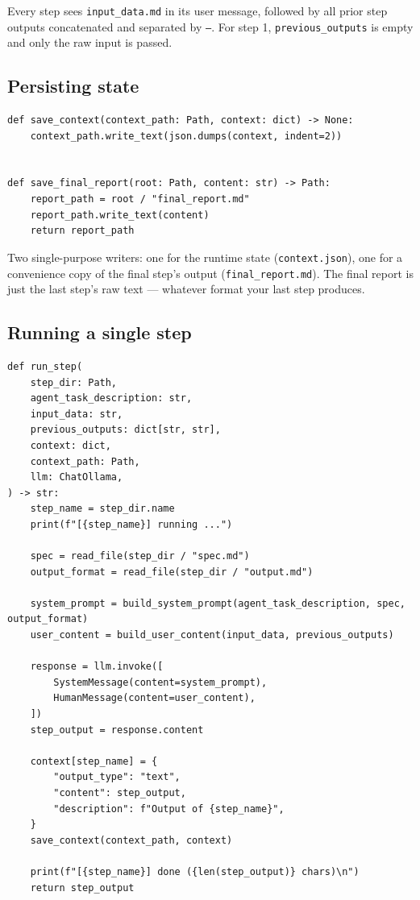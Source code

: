 \documentclass[12pt, a4paper]{article}
\begin{document}
Every step sees \texttt{input\_data.md} in its user message, followed by all prior step outputs concatenated and separated by \texttt{---}. For step 1, \texttt{previous\_outputs} is empty and only the raw input is passed.

\subsection{Persisting state}

\begin{lstlisting}[style=pythonstyle]
def save_context(context_path: Path, context: dict) -> None:
    context_path.write_text(json.dumps(context, indent=2))


def save_final_report(root: Path, content: str) -> Path:
    report_path = root / "final_report.md"
    report_path.write_text(content)
    return report_path
\end{lstlisting}

Two single-purpose writers: one for the runtime state (\texttt{context.json}), one for a convenience copy of the final step's output (\texttt{final\_report.md}). The final report is just the last step's raw text --- whatever format your last step produces.

\subsection{Running a single step}

\begin{lstlisting}[style=pythonstyle]
def run_step(
    step_dir: Path,
    agent_task_description: str,
    input_data: str,
    previous_outputs: dict[str, str],
    context: dict,
    context_path: Path,
    llm: ChatOllama,
) -> str:
    step_name = step_dir.name
    print(f"[{step_name}] running ...")

    spec = read_file(step_dir / "spec.md")
    output_format = read_file(step_dir / "output.md")

    system_prompt = build_system_prompt(agent_task_description, spec, output_format)
    user_content = build_user_content(input_data, previous_outputs)

    response = llm.invoke([
        SystemMessage(content=system_prompt),
        HumanMessage(content=user_content),
    ])
    step_output = response.content

    context[step_name] = {
        "output_type": "text",
        "content": step_output,
        "description": f"Output of {step_name}",
    }
    save_context(context_path, context)

    print(f"[{step_name}] done ({len(step_output)} chars)\n")
    return step_output
\end{lstlisting}
\end{document}
